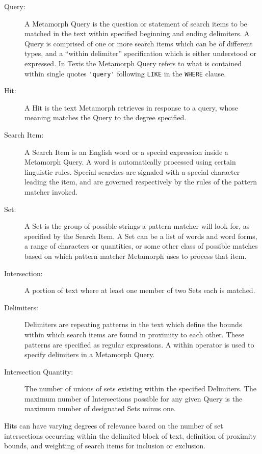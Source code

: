 \begin{description}
\item[Query:] A Metamorph Query is the question or statement of search
items to be matched in the text within specified beginning and ending
delimiters.  A Query is comprised of one or more search items which
can be of different types, and a ``within delimiter'' specification
which is either understood or expressed.  In Texis the Metamorph Query
refers to what is contained within single quotes \verb`'query'`
following \verb`LIKE` in the \verb`WHERE` clause.

\item[Hit:] A Hit is the text Metamorph retrieves in response to a
query, whose meaning matches the Query to the degree specified.

\item[Search Item:] A Search Item is an English word or a special
expression inside a Metamorph Query.  A word is automatically
processed using certain linguistic rules.  Special searches are
signaled with a special character leading the item, and are governed
respectively by the rules of the pattern matcher invoked.

\item[Set:] A Set is the group of possible strings a pattern matcher
will look for, as specified by the Search Item.  A Set can be a list
of words and word forms, a range of characters or quantities, or some
other class of possible matches based on which pattern matcher
Metamorph uses to process that item.

\item[Intersection:] A portion of text where at least one member of
two Sets each is matched.

\item[Delimiters:] Delimiters are repeating patterns in the text which
define the bounds within which search items are found in proximity to
each other.  These patterns are specified as regular expressions.  A
within operator is used to specify delimiters in a Metamorph Query.

\item[Intersection Quantity:] The number of unions of sets existing
within the specified Delimiters.  The maximum number of Intersections
possible for any given Query is the maximum number of designated Sets
minus one.
\end{description}

Hits can have varying degrees of relevance based on the number of set
intersections occurring within the delimited block of text, definition
of proximity bounds, and weighting of search items for inclusion or
exclusion.

